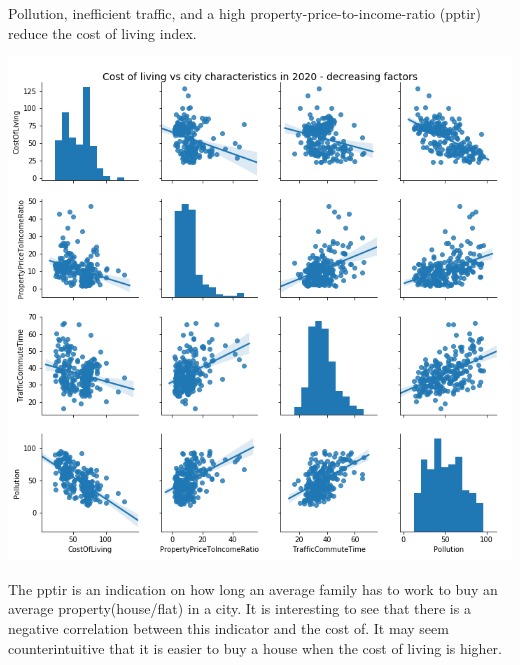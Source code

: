 \documentclass[
  twocolumn]{article}
\begin{document}
Pollution, inefficient traffic, and a high
property-price-to-income-ratio (pptir) reduce the cost of living index.

\includegraphics[width=1\linewidth]{visuals/CostOfLivingCorrelationIn2020NegativeInfluencers}

The pptir is an indication on how long an average family has to work to
buy an average property(house/flat) in a city. It is interesting to see
that there is a negative correlation between this indicator and the cost
of. It may seem counterintuitive that it is easier to buy a house when
the cost of living is higher.
\end{document}
